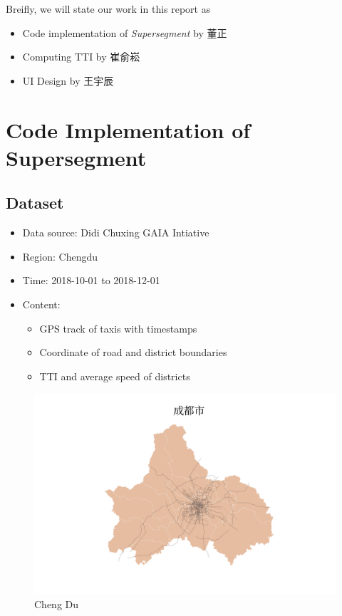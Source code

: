 \documentclass[fontset=none]{ctexart}
\theoremstyle{definition}
\theoremstyle{remark}
\begin{document}
Breifly, we will state our work in this report as
\begin{itemize}
  \item Code implementation of \textit{Supersegment} by 董正
  \item Computing TTI by 崔俞崧
  \item UI Design by 王宇辰
\end{itemize}

\clearpage
\section{Code Implementation of Supersegment}
\subsection{Dataset}
\begin{itemize}
    \item Data source: Didi Chuxing GAIA Intiative
    \item Region: Chengdu
    \item Time: 2018-10-01 to 2018-12-01
    \item Content:
        \begin{itemize}
            \item GPS track of taxis with timestamps
            \item Coordinate of road and district boundaries
            \item TTI and average speed of districts
        \end{itemize}
\end{itemize}
\begin{figure}[htb]
  \centering
  \includegraphics[width=\textwidth]{images/成都市.png}
  \caption{Cheng Du}
  \label{fig: chengdu}
\end{figure}
\end{document}
